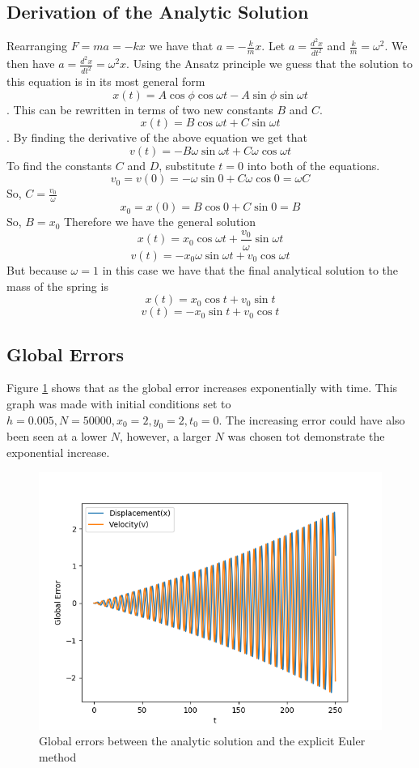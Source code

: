 \documentclass{article}
\begin{document}
\subsection{Derivation of the Analytic Solution}
Rearranging $F=ma=-kx$ we have that $a=-\frac{k}{m}x$. Let $a=\frac{d^2x}{dt^2}$ and $\frac{k}{m}=\omega^2$. We then have $a=\frac{d^2x}{dt^2}=\omega^2x$. Using the Ansatz principle we guess that the solution to this equation is in its most general form $$x(t)=A\cos{\phi}\cos{\omega t}-A\sin{\phi}\sin{\omega t}$$.
This can be rewritten in terms of two new constants $B$ and $C$.
$$x(t)=B\cos{\omega t}+C\sin{\omega t}$$.
By finding the derivative of the above equation we get that 
$$v(t)=-B\omega\sin{\omega t}+C\omega\cos{\omega t}$$
To find the constants $C$ and $D$, substitute $t=0$ into both of the equations. 
$$v_0=v(0)=-\omega\sin{0}+C\omega\cos{0}=\omega C$$
So, $C=\frac{v_0}{\omega}$
$$x_0=x(0)=B\cos{0}+C\sin{0}=B$$
So, $B=x_0$
Therefore we have the general solution
$$x(t)=x_0\cos{\omega t}+\frac{v_0}{\omega}\sin{\omega t}$$
$$v(t)=-x_0\omega\sin{\omega t}+v_0\cos{\omega t}$$
But because $\omega = 1$ in this case we have that the final analytical solution to the mass of the spring is
\begin{equation}
    x(t)=x_0\cos{t}+v_0\sin{t}
\end{equation}
\begin{equation}
    v(t)=-x_0\sin{t}+v_0\cos{t}
\end{equation}
\subsection{Global Errors}
Figure \ref{fig:globalerrorexp} shows that as the global error increases exponentially with time. This graph was made with initial conditions set to $h=0.005, N=50000, x_0=2, y_0=2, t_0=0$. The increasing error could have also been seen at a lower $N$, however, a larger $N$ was chosen tot demonstrate the exponential increase.
\begin{figure}[h]
    \centering
    \includegraphics[width = \textwidth]{Images/globalerrorexp.png}
    \caption{Global errors between the analytic solution and the explicit Euler method}
    \label{fig:globalerrorexp}
\end{figure}
\end{document}
